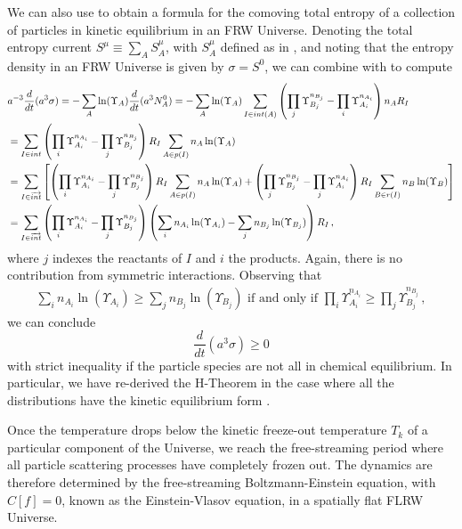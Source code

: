 {We can also use  to obtain a formula for the comoving total entropy of a collection of particles in kinetic equilibrium in an FRW Universe. Denoting the total entropy current $S^\mu\equiv\sum_A S_A^\mu$, with $S_A^\mu$ defined as in , and noting that the entropy density in an FRW Universe is given by $\sigma=S^0$, we can combine  with  to compute
\begin{align}
&a^{-3}\frac{d}{dt}(a^3\sigma)=-\sum_A \ln(\Upsilon_A) \frac{d}{dt}(a^3N_A^0)
=-\sum_A \ln(\Upsilon_A)\sum_{I\in int(A)} \left(\prod_j\Upsilon_{B_j}^{n_{B_j}}- \prod_i\Upsilon_{A_i}^{n_{A_i}}\right)n_A R_I\notag\\
&=\sum_{I\in int} \left( \prod_i\Upsilon_{A_i}^{n_{A_i}}-\prod_j\Upsilon_{B_j}^{n_{B_j}}\right)R_I\sum_{A\in p(I)}n_A \ln(\Upsilon_A)\notag\\
&=\sum_{I\in \overrightarrow{int}} \left[\left( \prod_i\Upsilon_{A_i}^{n_{A_i}}-\prod_j\Upsilon_{B_j}^{n_{B_j}}\right)R_I\sum_{A\in p(I)}n_A \ln(\Upsilon_A)
+\left( \prod_j\Upsilon_{B_j}^{n_{B_j}}-\prod_j\Upsilon_{A_i}^{n_{A_i}}\right)R_I\sum_{B\in r(I)}n_B \ln(\Upsilon_B)\right]\notag\\
&=\sum_{I\in \overrightarrow{int}} \left( \prod_i\Upsilon_{A_i}^{n_{A_i}}-\prod_j\Upsilon_{B_j}^{n_{B_j}}\right)\left(\sum_i n_{A_i}\ln(\Upsilon_{A_i})-\sum_jn_{B_j}\ln(\Upsilon_{B_j})\right)R_I\,, 
\end{align}
where $j$ indexes the reactants of $I$ and $i$ the products. Again, there is no contribution from symmetric interactions. Observing that 
 \begin{align}
 \sum_in_{A_i}\ln(\Upsilon_{A_i})\geq \sum_jn_{B_j} \ln(\Upsilon_{B_j}) \text{ if and only if }\prod_i \Upsilon^{n_{A_i}}_{A_i}\geq\prod_j\Upsilon^{n_{B_j}}_{B_j}
 \,,
 \end{align} 
 we can conclude 
\begin{equation}
\frac{d}{dt}(a^3\sigma)\geq 0
\end{equation}
with strict inequality if the particle species are not all in chemical equilibrium. In particular, we have re-derived the H-Theorem in the case where all the distributions have the kinetic equilibrium form .
}

Once the temperature drops below the kinetic freeze-out temperature $T_k$ of a particular component of the Universe, we reach the free-streaming period where all particle scattering processes have completely frozen out. The dynamics are therefore determined by the free-streaming Boltzmann-Einstein equation,  with $C[f]=0$, known as the Einstein-Vlasov equation, in a spatially flat FLRW Universe.

